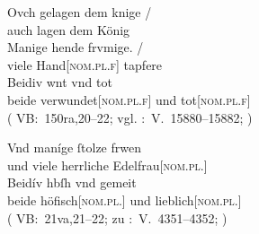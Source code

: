 \begin{exe}
\begin{xlist}
	\ex \label{ex:konjadjvvbeidiu_4} %
		\gll Ovch gelagen dem knige {/} \\
			auch lagen dem König \\
		\gll Manige hende frvmige. {/} \\
			viele Hand[\textsc{nom.pl.f\subM}] tapfere \\
		\gll Beidiv wnt vnd tot \\
			beide verwundet[\textsc{nom.pl.f\subM}] und
			tot[\textsc{nom.pl.f\subM}] \\
		\trans {}
			(%
				VB:~150ra,20--22; vgl.
				\KC:~V.~15880--15882;
				\cite[363]{schroeder1895}%
			)


	\ex \label{ex:konjadjvvbeidiu_6} %
		\gll Vnd maníge ſtolze frwen \\
			und viele herrliche Edelfrau[\textsc{nom.pl.\FemF}] \\
	\sn \gll Beidív hbſh vnd gemeit \\
			beide höfisch[\textsc{nom.pl.\FemF}] und lieblich[\textsc{nom.pl.\FemF}] \\
		\trans {}
			(%
				VB:~21va,21--22; zu
				\KC:~V.~4351--4352;
				\cite[161]{schroeder1895}%
			)
	\end{xlist}
\end{exe}

